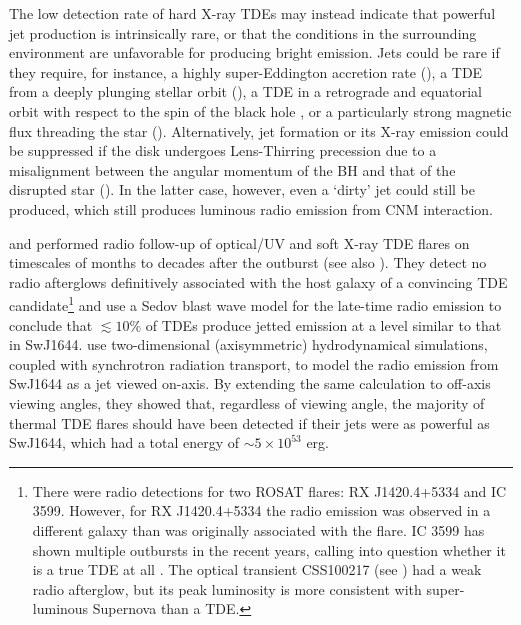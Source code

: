 \documentclass[usenatbib,fleqn]{mnras}
\begin{document}
The low detection rate of hard X-ray TDEs may instead indicate that powerful
jet production is intrinsically rare, or that the conditions in
the surrounding environment are unfavorable for producing bright
emission.  Jets could be rare if they require, for instance, a highly
super-Eddington accretion rate (\citealt{De-Colle+2012}), a TDE from a
deeply plunging stellar orbit (\citealt{Metzger&Stone2015}), a TDE in
a retrograde and equatorial orbit with respect to the spin of the
black hole \citep{Parfrey+2015}, or a particularly strong magnetic
flux threading the star (\citealt{Tchekhovskoy+2014,Kelley+2014}).
Alternatively, jet formation or its X-ray emission could be suppressed
if the disk undergoes Lens-Thirring precession due to a misalignment
between the angular momentum of the BH and that of the disrupted star
(\citealt{Stone&Loeb2012}).  In the latter case, however, even a
`dirty' jet could still be produced, which still produces luminous
radio emission from CNM interaction.

\citet{Bower+2013} and \citet{van-Velzen+2013} performed radio
follow-up of optical/UV and soft X-ray TDE flares on timescales of
months to decades after the outburst (see also
\citealt{Arcavi+2014}). They detect no radio afterglows definitively
associated with the host galaxy of a convincing TDE
candidate\footnote{There were radio detections for two ROSAT flares:
  RX J1420.4+5334 and IC 3599. However, for RX J1420.4+5334 the radio
  emission was observed in a different galaxy than was originally
  associated with the flare.  IC 3599 has shown multiple outbursts in
  the recent years, calling into question whether it is a true TDE at
  all \citep{Campana+2015}. The optical transient CSS100217 (see
  \citealt{Drake+2011}) had a weak radio afterglow, but its peak
  luminosity is more consistent with super-luminous Supernova than a
  TDE.} \citet{Bower+2013} and \citet{van-Velzen+2013} use a Sedov
blast wave model for the late-time radio emission to conclude that
$\lesssim 10\%$ of TDEs produce jetted emission at a level similar to
that in SwJ1644.  \citet{Mimica+2015} use two-dimensional
(axisymmetric) hydrodynamical simulations, coupled with synchrotron
radiation transport, to model the radio emission from SwJ1644 as a jet
viewed on-axis.  By extending the same calculation to off-axis viewing
angles, they showed that, regardless of viewing angle, the majority of
thermal TDE flares should have been detected if their jets were as
powerful as SwJ1644, which had a total energy of $\sim 5\times
10^{53}$ erg.
\end{document}
